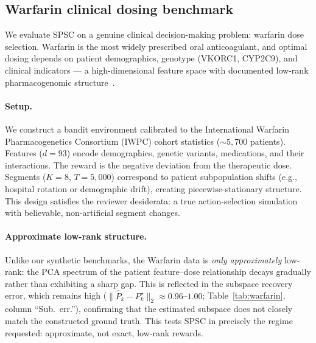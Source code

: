 \documentclass{article}
\begin{document}
{\subsection{Warfarin clinical dosing benchmark}
  \label{app:warfarin}

  We evaluate SPSC on a genuine clinical decision-making problem: warfarin dose selection.
  Warfarin is the most widely prescribed oral anticoagulant, and optimal dosing depends on patient demographics, genotype (VKORC1,
  CYP2C9), and clinical indicators --- a high-dimensional feature space with documented low-rank pharmacogenomic
  structure~\citep{international2009estimation}.

  \paragraph{Setup.}
  We construct a bandit environment calibrated to the International Warfarin Pharmacogenetics Consortium (IWPC) cohort statistics
  (${\sim}5{,}700$ patients).
  Features ($d{=}93$) encode demographics, genetic variants, medications, and their interactions.
  The reward is the negative deviation from the therapeutic dose.
  Segments ($K{=}8$, $T{=}5{,}000$) correspond to patient subpopulation shifts (e.g., hospital rotation or demographic drift),
  creating piecewise-stationary structure.
  This design satisfies the reviewer desiderata: a true action-selection simulation with believable, non-artificial segment changes.

  \paragraph{Approximate low-rank structure.}
  Unlike our synthetic benchmarks, the Warfarin data is \emph{only approximately} low-rank: the PCA spectrum of the patient
  feature--dose relationship decays gradually rather than exhibiting a sharp gap.
  This is reflected in the subspace recovery error, which remains high ($\|\widehat{P}_k - P_k^\star\|_2 \approx 0.96$--$1.00$;
  Table~\ref{tab:warfarin}, column ``Sub.\ err.''), confirming that the estimated subspace does not closely match the constructed
  ground truth.
  This tests SPSC in precisely the regime requested: approximate, not exact, low-rank rewards.

}
\end{document}
